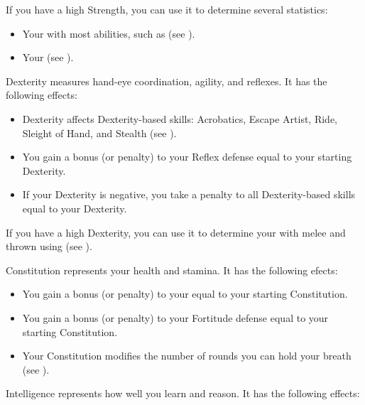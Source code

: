                 If you have a high Strength, you can use it to determine several statistics:
                \begin{itemize}
                    \item Your  with most  abilities, such as  (see ).
                    \item Your  (see ).
                \end{itemize}

            \label{Dexterity}
                Dexterity measures hand-eye coordination, agility, and reflexes.
                It has the following effects:
                \begin{itemize}
                    \item Dexterity affects Dexterity-based skills: Acrobatics, Escape Artist, Ride, Sleight of Hand, and Stealth (see ).
                    \item You gain a bonus (or penalty) to your Reflex defense equal to your starting Dexterity.
                    \item If your Dexterity is negative, you take a penalty to all Dexterity-based skills equal to your Dexterity.
                \end{itemize}

                If you have a high Dexterity, you can use it to determine your  with melee and thrown  using  (see ).

            \label{Constitution}
                Constitution represents your health and stamina.
                It has the following efects:
                \begin{itemize}
                    \item You gain a bonus (or penalty) to your  equal to your starting Constitution.
                    \item You gain a bonus (or penalty) to your Fortitude defense equal to your starting Constitution.
                    \item Your Constitution modifies the number of rounds you can hold your breath (see ).
                \end{itemize}

            \label{Intelligence}
                Intelligence represents how well you learn and reason.
                It has the following effects:

